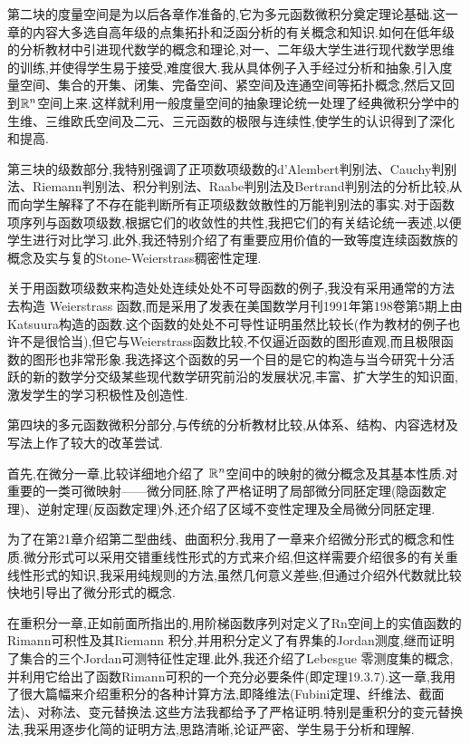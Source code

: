 第二块的度量空间是为以后各章作准备的,它为多元函数微积分奠定理论基础.这一章的内容大多选自高年级的点集拓扑和泛函分析的有关概念和知识.如何在低年级的分析教材中引进现代数学的概念和理论,对一、二年级大学生进行现代数学思维的训练,并使得学生易于接受,难度很大.我从具体例子入手经过分析和抽象,引入度量空间、集合的开集、闭集、完备空间、紧空间及连通空间等拓扑概念,然后又回到$\mathbb{R}^n$空间上来.这样就利用一般度量空间的抽象理论统一处理了经典微积分学中的生维、三维欧氏空间及二元、三元函数的极限与连续性,使学生的认识得到了深化和提高.

第三块的级数部分,我特别强调了正项数项级数的d'Alembert判别法、Cauchy判别法、Riemann判别法、积分判别法、Raabe判别法及Bertrand判别法的分析比较,从而向学生解释了不存在能判断所有正项级数敛散性的万能判别法的事实.对于函数项序列与函数项级数,根据它们的收敛性的共性,我把它们的有关结论统一表述,以便学生进行对比学习.此外,我还特别介绍了有重要应用价值的一致等度连续函数族的概念及实与复的Stone-Weierstrass稠密性定理.

关于用函数项级数来构造处处连续处处不可导函数的例子,我没有采用通常的方法去构造 Weierstrass 函数,而是采用了发表在美国数学月刊1991年第198卷第5期上由Katsuura构造的函数.这个函数的处处不可导性证明虽然比较长(作为教材的例子也许不是很恰当),但它与Weierstrass函数比较,不仅逼近函数的图形直观,而且极限函数的图形也非常形象.我选择这个函数的另一个目的是它的构造与当今研究十分活跃的新的数学分交级某些现代数学研究前沿的发展状况,丰富、扩大学生的知识面,激发学生的学习积极性及创造性.

第四块的多元函数微积分部分,与传统的分析教材比较,从体系、结构、内容选材及写法上作了较大的改革尝试.

首先,在微分一章,比较详细地介绍了 $\mathbb{R}^n$空间中的映射的微分概念及其基本性质.对重要的一类可微映射------微分同胚,除了严格证明了局部微分同胚定理(隐函数定理)、逆射定理(反函数定理)外,还介绍了区域不变性定理及全局微分同胚定理.

为了在第21章介绍第二型曲线、曲面积分,我用了一章来介绍微分形式的概念和性质.微分形式可以采用交错重线性形式的方式来介绍,但这样需要介绍很多的有关重线性形式的知识,我采用纯规则的方法,虽然几何意义差些,但通过介绍外代数就比较快地引导出了微分形式的概念.

在重积分一章,正如前面所指出的,用阶梯函数序列对定义了Rn空间上的实值函数的Rimann可积性及其Riemann 积分,并用积分定义了有界集的Jordan测度,继而证明了集合的三个Jordan可测特征性定理.此外,我还介绍了Lebesgue 零测度集的概念,并利用它给出了函数Rimann可积的一个充分必要条件(即定理19.3.7).这一章,我用了很大篇幅来介绍重积分的各种计算方法,即降维法(Fubini定理、纤维法、截面法)、对称法、变元替换法.这些方法我都给予了严格证明.特别是重积分的变元替换法,我采用逐步化简的证明方法,思路清晰,论证严密、学生易于分析和理解.

